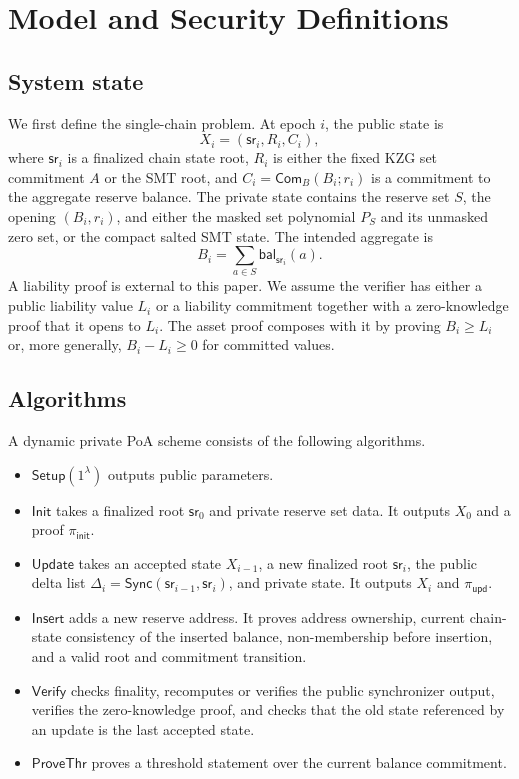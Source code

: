 \documentclass[runningheads]{llncs}
\newcommand{\Com}{\mathsf{Com}}
\newcommand{\bal}{\mathsf{bal}}
\newcommand{\sr}{\mathsf{sr}}
\newcommand{\Setup}{\mathsf{Setup}}
\newcommand{\Verify}{\mathsf{Verify}}
\newcommand{\Init}{\mathsf{Init}}
\newcommand{\Upd}{\mathsf{Update}}
\newcommand{\Insert}{\mathsf{Insert}}
\newcommand{\Sync}{\mathsf{Sync}}
\newcommand{\dlist}{\Delta}
\begin{document}
\section{Model and Security Definitions}

\subsection{System state}

We first define the single-chain problem.  At epoch \(i\), the public state is
\[
        X_i=(\sr_i,R_i,C_i),
\]
where \(\sr_i\) is a finalized chain state root, \(R_i\) is either the fixed KZG set commitment \(A\) or the SMT root, and \(C_i=\Com_B(B_i;r_i)\) is a commitment to the aggregate reserve balance.  The private state contains the reserve set \(S\), the opening \((B_i,r_i)\), and either the masked set polynomial \(P_S\) and its unmasked zero set, or the compact salted SMT state.  The intended aggregate is
\[
        B_i=\sum_{a\in S}\bal_{\sr_i}(a).
\]
A liability proof is external to this paper.  We assume the verifier has either a public liability value \(L_i\) or a liability commitment together with a zero-knowledge proof that it opens to \(L_i\).  The asset proof composes with it by proving \(B_i\ge L_i\) or, more generally, \(B_i-L_i\ge 0\) for committed values.

\subsection{Algorithms}

A dynamic private PoA scheme consists of the following algorithms.

\begin{itemize}[leftmargin=1.5em]
    \item \(\Setup(1^\lambda)\) outputs public parameters.
    \item \(\Init\) takes a finalized root \(\sr_0\) and private reserve set data.  It outputs \(X_0\) and a proof \(\pi_{\mathsf{init}}\).
    \item \(\Upd\) takes an accepted state \(X_{i-1}\), a new finalized root \(\sr_i\), the public delta list \(\dlist_i=\Sync(\sr_{i-1},\sr_i)\), and private state.  It outputs \(X_i\) and \(\pi_{\mathsf{upd}}\).
    \item \(\Insert\) adds a new reserve address.  It proves address ownership, current chain-state consistency of the inserted balance, non-membership before insertion, and a valid root and commitment transition.
    \item \(\Verify\) checks finality, recomputes or verifies the public synchronizer output, verifies the zero-knowledge proof, and checks that the old state referenced by an update is the last accepted state.
    \item \(\mathsf{ProveThr}\) proves a threshold statement over the current balance commitment.
\end{itemize}
\end{document}
